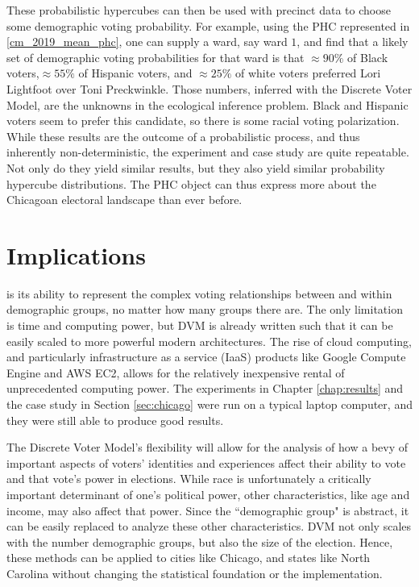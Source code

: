 These probabilistic hypercubes can then be used with precinct data to choose some demographic voting probability. For example, using the PHC represented in \ref{cm_2019_mean_phc}, one can supply a ward, say ward $1$, and find that a likely set of demographic voting probabilities for that ward is that $\approx 90\%$ of Black voters,$\approx 55\%$ of Hispanic voters, and $\approx 25\%$ of white voters preferred Lori Lightfoot over Toni Preckwinkle. Those numbers, inferred with the Discrete Voter Model, are the unknowns in the ecological inference problem. Black and Hispanic voters seem to prefer this candidate, so there is some racial voting polarization. While these results are the outcome of a probabilistic process, and thus inherently non-deterministic, the experiment and case study are quite repeatable. Not only do they yield similar results, but they also yield similar probability hypercube distributions. The PHC object can thus express more about the Chicagoan electoral landscape than ever before.


\section{Implications}

 is its ability to represent the complex voting relationships between and within demographic groups, no matter how many groups there are. The only limitation is time and computing power, but DVM is already written such that it can be easily scaled to more powerful modern architectures. The rise of cloud computing, and particularly infrastructure as a service (IaaS) products like Google Compute Engine and AWS EC2, allows for the relatively inexpensive rental of unprecedented computing power. The experiments in Chapter \ref{chap:results} and the case study in Section \ref{sec:chicago} were run on a typical laptop computer, and they were still able to produce good results.

The Discrete Voter Model's flexibility will allow for the analysis of how a bevy of important aspects of voters' identities and experiences affect their ability to vote and that vote's power in elections. While race is unfortunately a critically important determinant of one's political power, other characteristics, like age and income, may also affect that power. Since the ``demographic group" is abstract, it can be easily replaced to analyze these other characteristics. DVM not only scales with the number demographic groups, but also the size of the election. Hence, these methods can be applied to cities like Chicago, and states like North Carolina without changing the statistical foundation or the implementation.


